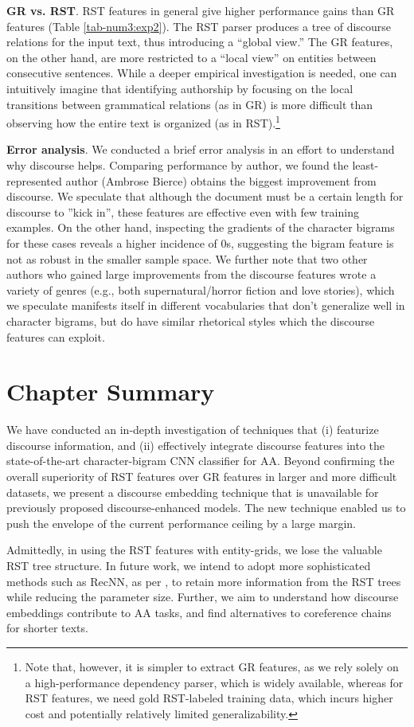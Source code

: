 \noindent
\textbf{GR vs. RST}.
RST features in general give higher performance gains than GR features (Table \ref{tab-num3:exp2}).
The RST parser produces a tree of discourse relations for the input text, thus introducing a ``global view.''
The GR features, on the other hand, are more restricted to a ``local view'' on entities between consecutive sentences. 
While a deeper empirical investigation is needed, one can intuitively imagine that identifying authorship by focusing on the local transitions between grammatical relations (as in GR) is more difficult than observing how the entire text is organized (as in RST).\footnote{Note that, however, it is simpler to extract GR features, as we rely solely on a high-performance dependency parser, which is widely available, whereas for RST features, we need gold RST-labeled training data, which incurs higher cost and potentially relatively limited generalizability.}
\medskip

\noindent
\textbf{Error analysis}. We conducted a brief error analysis in an effort to understand why discourse helps. Comparing performance by author, we found the least-represented author (Ambrose Bierce) obtains the biggest improvement from discourse. We speculate that although the document must be a certain length for discourse to ''kick in'', these features are effective even with few training examples. On the other hand, inspecting the gradients of the character bigrams for these cases reveals a higher incidence of 0s, suggesting the bigram feature is not as robust in the smaller sample space. We further note that two other authors who gained large improvements from the discourse features wrote a variety of genres (e.g., both supernatural/horror fiction and love stories), which we speculate manifests itself in different vocabularies that don’t generalize well in character bigrams, but do have similar rhetorical styles which the discourse features can exploit.
\section{Chapter Summary}
\label{sec:conclusion}
We have conducted an in-depth investigation of techniques that (i) featurize discourse information, and (ii) effectively integrate discourse features into the state-of-the-art character-bigram CNN classifier for AA. 
Beyond confirming the overall superiority of RST features over GR features in larger and more difficult datasets, we present a discourse embedding technique that is unavailable for previously proposed discourse-enhanced models.
The new technique enabled us to push the envelope of the current performance ceiling by a large margin. 

Admittedly, in using the RST features with entity-grids, we lose the valuable RST tree structure.
In future work, we intend to adopt more sophisticated methods such as RecNN, as per , to retain more information from the RST trees while reducing the parameter size. Further, we aim to understand how discourse embeddings contribute to AA tasks, and find alternatives to coreference chains for shorter texts.